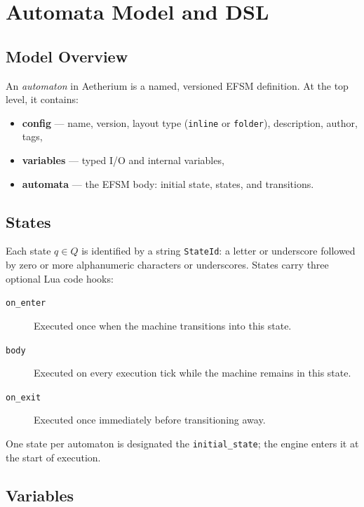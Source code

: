\chapter{Automata Model and DSL}
\label{chap:model}

\section{Model Overview}
\label{sec:model-overview}

An \textit{automaton} in Aetherium is a named, versioned EFSM definition. At the top level, it contains:
\begin{itemize}
  \item \textbf{config} --- name, version, layout type (\texttt{inline} or \texttt{folder}), description, author, tags,
  \item \textbf{variables} --- typed I/O and internal variables,
  \item \textbf{automata} --- the EFSM body: initial state, states, and transitions.
\end{itemize}

\section{States}

Each state $q \in Q$ is identified by a string \texttt{StateId}: a letter or underscore followed by zero or more alphanumeric characters or underscores. States carry three optional Lua code hooks:

\begin{description}
  \item[\texttt{on\_enter}] Executed once when the machine transitions into this state.
  \item[\texttt{body}] Executed on every execution tick while the machine remains in this state.
  \item[\texttt{on\_exit}] Executed once immediately before transitioning away.
\end{description}

One state per automaton is designated the \texttt{initial\_state}; the engine enters it at the start of execution.

\section{Variables}
\label{sec:variables}

